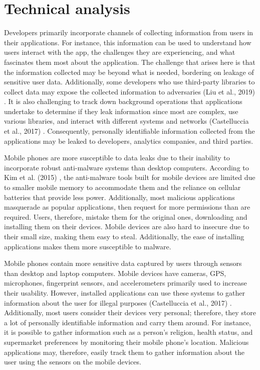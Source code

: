 \documentclass{article}
\begin{document}
\section*{Technical analysis}
Developers primarily incorporate channels of collecting information from users in their applications. For instance, this information can be used to understand how users interact with the app, the challenges they are experiencing, and what fascinates them most about the application. The challenge that arises here is that the information collected may be beyond what is needed, bordering on leakage of sensitive user data. Additionally, some developers who use third-party libraries to collect data may expose the collected information to adversaries (Liu et al., 2019) \cite{Liu19}. It is also challenging to track down background operations that applications undertake to determine if they leak information since most are complex, use various libraries, and interact with different systems and networks (Castelluccia et al., 2017) \cite{Castelluccia17}. Consequently, personally identifiable information collected from the applications may be leaked to developers, analytics companies, and third parties.


\medskip

Mobile phones are more susceptible to data leaks due to their inability to incorporate robust anti-malware systems than desktop computers. According to Kim et al. (2015) \cite{Kim15}, the anti-malware tools built for mobile devices are limited due to smaller mobile memory to accommodate them and the reliance on cellular batteries that provide less power. Additionally, most malicious applications masquerade as popular applications, then request for more permissions than are required. Users, therefore, mistake them for the original ones, downloading and installing them on their devices. Mobile devices are also hard to insecure due to their small size, making them easy to steal. Additionally, the ease of installing applications makes them more susceptible to malware.


\medskip

Mobile phones contain more sensitive data captured by users through sensors than desktop and laptop computers. Mobile devices have cameras, GPS, microphones, fingerprint sensors, and accelerometers primarily used to increase their usability. However, installed applications can use these systems to gather information about the user for illegal purposes (Castelluccia et al., 2017) \cite{Castelluccia17}. Additionally, most users consider their devices very personal; therefore, they store a lot of personally identifiable information and carry them around. For instance, it is possible to gather information such as a person’s religion, health status, and supermarket preferences by monitoring their mobile phone’s location. Malicious applications may, therefore, easily track them to gather information about the user using the sensors on the mobile devices.
\end{document}
